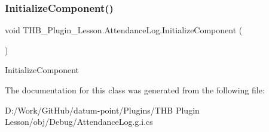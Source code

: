 \subsubsection{\texorpdfstring{Initialize\+Component()}{InitializeComponent()}\hspace{0.1cm}{\footnotesize\ttfamily [2/2]}}
{\footnotesize\ttfamily void T\+H\+B\+\_\+\+Plugin\+\_\+\+Lesson.\+Attendance\+Log.\+Initialize\+Component (\begin{DoxyParamCaption}{ }\end{DoxyParamCaption})}



Initialize\+Component 



The documentation for this class was generated from the following file\+:\begin{DoxyCompactItemize}
\item 
D\+:/\+Work/\+Git\+Hub/datum-\/point/\+Plugins/\+T\+H\+B Plugin Lesson/obj/\+Debug/Attendance\+Log.\+g.\+i.\+cs\end{DoxyCompactItemize}
